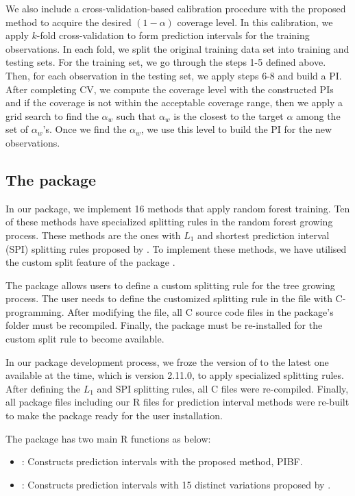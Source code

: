 We also include a cross-validation-based calibration procedure with the proposed method to acquire the desired $\left(1-\alpha\right)$ coverage level. In this calibration, we apply $k$-fold cross-validation to form prediction intervals for the training observations. In each fold, we split the original training data set into training and testing sets. For the training set, we go through the steps 1-5 defined above. Then, for each observation in the testing set, we apply steps 6-8 and build a PI. After completing CV, we compute the coverage level with the constructed PIs and if the coverage is not within the acceptable coverage range, then we apply a grid search to find the $\alpha_w$ such that $\alpha_w$ is the closest to the target $\alpha$ among the set of $\alpha_w$'s. Once we find the $\alpha_w$, we use this level to build the PI for the new observations. 

\subsection{The  package}

In our package, we implement 16 methods that apply random forest training. Ten of these methods have specialized splitting rules in the random forest growing process. These methods are the ones with $L_1$ and shortest prediction interval (SPI) splitting rules proposed by \citet{roy_prediction_2020}. To implement these methods, we have utilised the custom split feature of the  package \citep{R-randomForestSRC}.

The  package allows users to define a custom splitting rule for the tree growing process. The user needs to define the customized splitting rule in the  file with C-programming. After modifying the  file, all C source code files in the package's  folder must be recompiled. Finally, the package must be re-installed for the custom split rule to become available.

In our package development process, we froze the version of  to the latest one available at the time, which is version 2.11.0, to apply specialized splitting rules. After defining the $L_1$ and SPI splitting rules, all C files were re-compiled. Finally, all package files including our R files for prediction interval methods were re-built to make the package ready for the user installation.

The  package has two main R functions as below:
\begin{itemize}
    \item {}: Constructs prediction intervals with the proposed method, PIBF.
    \item {}: Constructs prediction intervals with 15 distinct variations proposed by \citet{roy_prediction_2020}. 
\end{itemize}

